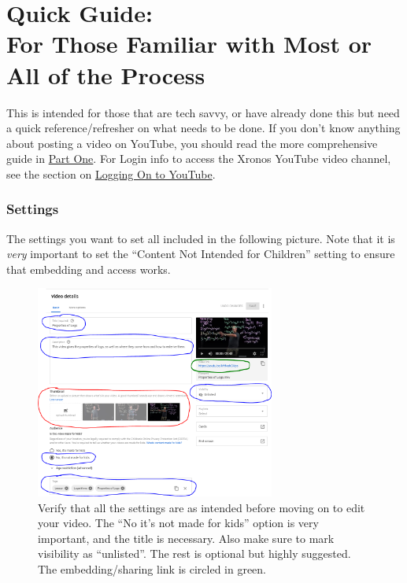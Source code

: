 \documentclass{article}
\begin{document}
        
        \newpage
\part{Quick Guide: \\ For Those Familiar with Most or All of the Process}

    This is intended for those that are tech savvy, or have already done this but need a quick reference/refresher on what needs to be done. If you don't know anything about posting a video on YouTube, you should read the more comprehensive guide in \hyperref[partOne]{Part One}. For Login info to access the Xronos YouTube video channel, see the section on \hyperref[loggingOn]{Logging On to YouTube}.
    
    \section{Settings}
    
        The settings you want to set all included in the following picture. Note that it is \textit{very} important to set the ``Content Not Intended for Children'' setting to ensure that embedding and access works.
    
        \begin{figure}[h]
            \includegraphics[width=0.7\textwidth]{videoDetails.png}
            \caption{Verify that all the settings are as intended before moving on to edit your video. The ``No it's not made for kids'' option is very important, and the title is necessary. Also make sure to mark visibility as ``unlisted''. The rest is optional but highly suggested. The embedding/sharing link is circled in green.}
        \end{figure}
    
\end{document}
